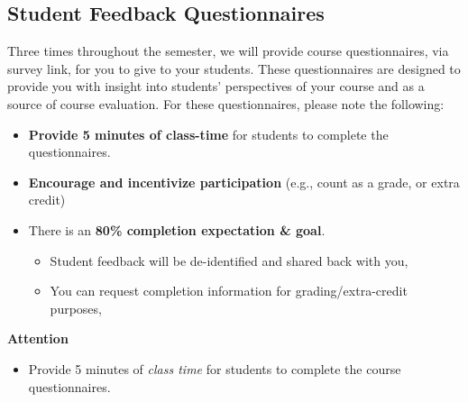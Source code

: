 \documentclass[
  letterpaper,
  DIV=11,
  numbers=noendperiod]{scrreprt}
\providecommand{\tightlist}{%
  \setlength{\itemsep}{0pt}\setlength{\parskip}{0pt}}
\begin{document}
\subsection{Student Feedback
Questionnaires}\label{student-feedback-questionnaires}

Three times throughout the semester, we will provide course
questionnaires, via survey link, for you to give to your students. These
questionnaires are designed to provide you with insight into students'
perspectives of your course and as a source of course evaluation. For
these questionnaires, please note the following:

\begin{itemize}
\item
  \textbf{Provide 5 minutes of class-time} for students to complete the
  questionnaires.
\item
  \textbf{Encourage and incentivize participation} (e.g., count as a
  grade, or extra credit)
\item
  There is an \textbf{80\% completion expectation \& goal}.

  \begin{itemize}
  \tightlist
  \item
    Student feedback will be de-identified and shared back with you,
  \item
    You can request completion information for grading/extra-credit
    purposes,
  \end{itemize}
\end{itemize}

\begin{tcolorbox}[enhanced jigsaw, toprule=.15mm, colback=white, arc=.35mm, colframe=quarto-callout-note-color-frame, bottomrule=.15mm, rightrule=.15mm, breakable, leftrule=.75mm, left=2mm, opacityback=0]
\begin{minipage}[t]{5.5mm}
\textcolor{quarto-callout-note-color}{\faInfo}
\end{minipage}%
\begin{minipage}[t]{\textwidth - 5.5mm}

\vspace{-3mm}\textbf{{Attention}}\vspace{3mm}

\begin{itemize}
\tightlist
\item
  {Provide 5 minutes of \emph{class time} for students to complete the
  course questionnaires.}
\end{itemize}

\end{minipage}%
\end{tcolorbox}
\end{document}
